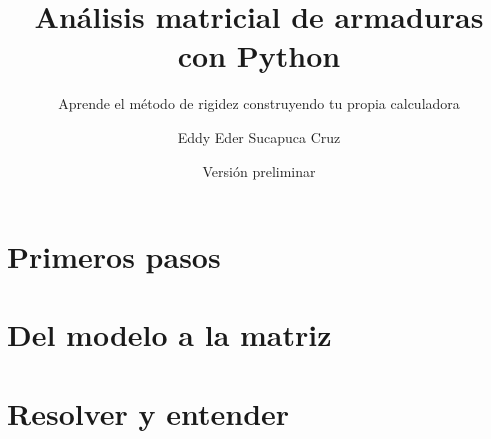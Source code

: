 \documentclass[
  fontsize=10.5pt,
  twoside=true,
  open=right,
  headings=standardclasses,
  numbers=noenddot,
  bibliography=totoc,
]{scrbook}
\title{Análisis matricial de armaduras con Python}
\subtitle{Aprende el método de rigidez construyendo tu propia calculadora}
\author{Eddy Eder Sucapuca Cruz}
\date{Versión preliminar}
\begin{document}
\frontmatter

\tableofcontents


\mainmatter
\part{Primeros pasos}



\part{Del modelo a la matriz}






\part{Resolver y entender}






\appendix







\backmatter
\nocite{*}
\printbibliography[title={Bibliografía}]
\printindex
\end{document}
